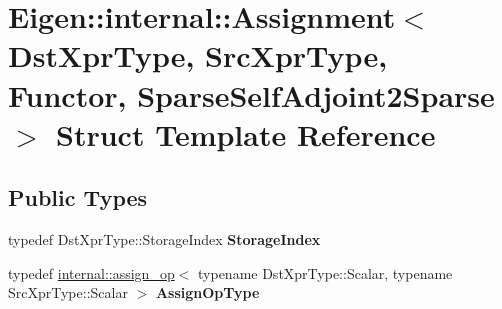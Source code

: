 \hypertarget{struct_eigen_1_1internal_1_1_assignment_3_01_dst_xpr_type_00_01_src_xpr_type_00_01_functor_00_017b35cf78061a31c93b838bddfa619fa3}{}\section{Eigen\+::internal\+::Assignment$<$ Dst\+Xpr\+Type, Src\+Xpr\+Type, Functor, Sparse\+Self\+Adjoint2\+Sparse $>$ Struct Template Reference}
\label{struct_eigen_1_1internal_1_1_assignment_3_01_dst_xpr_type_00_01_src_xpr_type_00_01_functor_00_017b35cf78061a31c93b838bddfa619fa3}
\subsection*{Public Types}
\begin{DoxyCompactItemize}
\item 
\mbox{\label{struct_eigen_1_1internal_1_1_assignment_3_01_dst_xpr_type_00_01_src_xpr_type_00_01_functor_00_017b35cf78061a31c93b838bddfa619fa3_a429efae6af903e6754d8ed4bfd28948a}} 
typedef Dst\+Xpr\+Type\+::\+Storage\+Index {\bfseries Storage\+Index}
\item 
\mbox{\label{struct_eigen_1_1internal_1_1_assignment_3_01_dst_xpr_type_00_01_src_xpr_type_00_01_functor_00_017b35cf78061a31c93b838bddfa619fa3_ad85cf07ae0637a29d606af6dbc03405c}} 
typedef \mbox{\hyperlink{struct_eigen_1_1internal_1_1assign__op}{internal\+::assign\+\_\+op}}$<$ typename Dst\+Xpr\+Type\+::\+Scalar, typename Src\+Xpr\+Type\+::\+Scalar $>$ {\bfseries Assign\+Op\+Type}
\end{DoxyCompactItemize}
